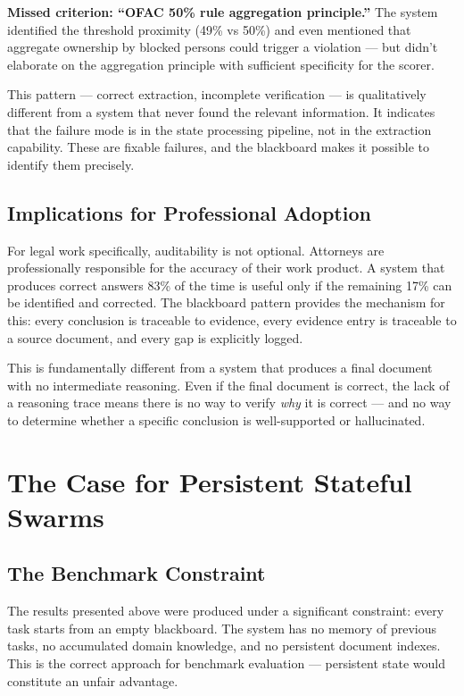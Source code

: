 \documentclass[11pt,a4paper]{article}
\begin{document}
\textbf{Missed criterion: ``OFAC 50\% rule aggregation principle.''} The system identified the threshold proximity (49\% vs 50\%) and even mentioned that aggregate ownership by blocked persons could trigger a violation — but didn't elaborate on the aggregation principle with sufficient specificity for the scorer.

This pattern — correct extraction, incomplete verification — is qualitatively different from a system that never found the relevant information. It indicates that the failure mode is in the state processing pipeline, not in the extraction capability. These are fixable failures, and the blackboard makes it possible to identify them precisely.

\subsection{Implications for Professional Adoption}

For legal work specifically, auditability is not optional. Attorneys are professionally responsible for the accuracy of their work product. A system that produces correct answers 83\% of the time is useful only if the remaining 17\% can be identified and corrected. The blackboard pattern provides the mechanism for this: every conclusion is traceable to evidence, every evidence entry is traceable to a source document, and every gap is explicitly logged.

This is fundamentally different from a system that produces a final document with no intermediate reasoning. Even if the final document is correct, the lack of a reasoning trace means there is no way to verify \textit{why} it is correct — and no way to determine whether a specific conclusion is well-supported or hallucinated.


\section{The Case for Persistent Stateful Swarms}

\subsection{The Benchmark Constraint}

The results presented above were produced under a significant constraint: every task starts from an empty blackboard. The system has no memory of previous tasks, no accumulated domain knowledge, and no persistent document indexes. This is the correct approach for benchmark evaluation — persistent state would constitute an unfair advantage.
\end{document}
